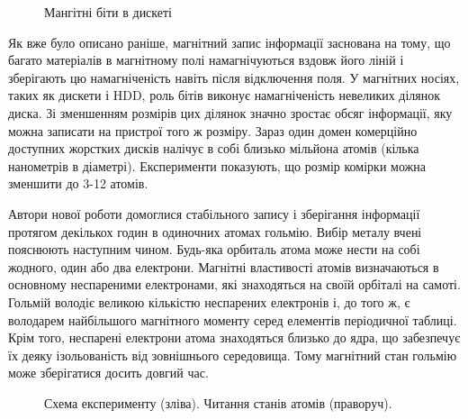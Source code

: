 \documentclass[a4paper,14pt]{extreport}
\begin{document}
\begin{figure}[h]
  \caption{Мангітні біти в дискеті}
  \label{ris5}
\end{figure}

Як вже було описано раніше, магнітний запис інформації заснована на тому, що багато матеріалів в магнітному полі намагнічуються вздовж його ліній і зберігають цю намагніченість навіть після відключення поля. У магнітних носіях, таких як дискети і HDD, роль бітів виконує намагніченість невеликих ділянок диска. Зі зменшенням розмірів цих ділянок значно зростає обсяг інформації, яку можна записати на пристрої того ж розміру. Зараз один домен комерційно доступних жорстких дисків налічує в собі близько мільйона атомів (кілька нанометрів в діаметрі). Експерименти показують, що розмір комірки можна зменшити до 3-12 атомів.\par

Автори нової роботи домоглися стабільного запису і зберігання інформації протягом декількох годин в одиночних атомах гольмію. Вибір металу вчені пояснюють наступним чином. Будь-яка орбиталь атома може нести на собі жодного, один або два електрони. Магнітні властивості атомів визначаються в основному неспареними електронами, які знаходяться на своїй орбіталі на самоті. Гольмій володіє великою кількістю неспарених електронів і, до того ж, є володарем найбільшого магнітного моменту серед елементів періодичної таблиці. Крім того, неспарені електрони атома знаходяться близько до ядра, що забезпечує їх деяку ізольованість від зовнішнього середовища. Тому магнітний стан гольмію може зберігатися досить довгий час.\par

\begin{figure}[h]
  \caption{Схема експерименту (зліва). Читання станів атомів (праворуч).}
  \label{ris6}
\end{figure}
\end{document}
